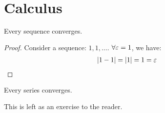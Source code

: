 \setcounter{section}{0}

\section{Calculus}

\begin{thm}
  Every sequence converges.
\end{thm}
\begin{proof}
  Consider a sequence: $1,1,\ldots$. $\forall \varepsilon=1$, we have:
  \begin{align*}
    |1-1| = |1| = 1 = \varepsilon
  \end{align*}
\end{proof}

\setcounter{lem}{0}
\begin{cor}
  Every series converges.
\end{cor}
This is left as an exercise to the reader.
